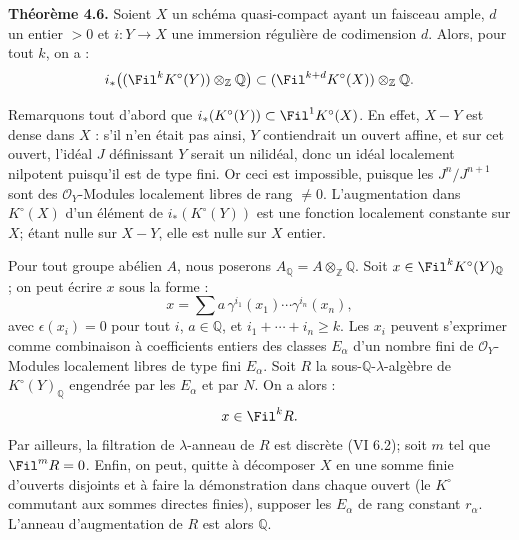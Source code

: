 \textbf{Théorème 4.6.}
Soient \(X\) un schéma quasi-compact ayant un faisceau ample, \(d\) un entier \(>0\) et \(i:Y\to X\) une immersion régulière de codimension \(d\). Alors, pour tout \(k\), on a :
\[
 i_*\bigl((\Fil^kK^\circ(Y))\otimes_{\mathbb Z}\mathbb Q\bigr)
 \subset
 (\Fil^{k+d}K^\circ(X))\otimes_{\mathbb Z}\mathbb Q.
\]

Remarquons tout d'abord que \(i_*(K^\circ(Y))\subset \Fil^1K^\circ(X)\). En effet, \(X-Y\) est dense dans \(X\) : s'il n'en était pas ainsi, \(Y\) contiendrait un ouvert affine, et sur cet ouvert, l'idéal \(J\) définissant \(Y\) serait un nilidéal, donc un idéal localement nilpotent puisqu'il est de type fini. Or ceci est impossible, puisque les \(J^n/J^{n+1}\) sont des \(\mathcal O_Y\)-Modules localement libres de rang \(\ne0\). L'augmentation dans \(K^\circ(X)\) d'un élément de \(i_*(K^\circ(Y))\) est une fonction localement constante sur \(X\); étant nulle sur \(X-Y\), elle est nulle sur \(X\) entier.

Pour tout groupe abélien \(A\), nous poserons \(A_{\mathbb Q}=A\otimes_{\mathbb Z}\mathbb Q\). Soit \(x\in\Fil^kK^\circ(Y)_{\mathbb Q}\) ; on peut écrire \(x\) sous la forme :
\[
  x=\sum a\,\gamma^{i_1}(x_1)\cdots\gamma^{i_n}(x_n),
\]
avec \(\epsilon(x_i)=0\) pour tout \(i\), \(a\in\mathbb Q\), et \(i_1+\cdots+i_n\ge k\). Les \(x_i\) peuvent s'exprimer comme combinaison à coefficients entiers des classes \(E_\alpha\) d'un nombre fini de \(\mathcal O_Y\)-Modules localement libres de type fini \(E_\alpha\). Soit \(R\) la sous-\(\mathbb Q\)-\(\lambda\)-algèbre de \(K^\circ(Y)_{\mathbb Q}\) engendrée par les \(E_\alpha\) et par \(N\). On a alors :
\[
  x\in\Fil^kR.
\]
Par ailleurs, la filtration de \(\lambda\)-anneau de \(R\) est discrète (VI 6.2); soit \(m\) tel que \(\Fil^mR=0\). Enfin, on peut, quitte à décomposer \(X\) en une somme finie d'ouverts disjoints et à faire la démonstration dans chaque ouvert (le \(K^\circ\) commutant aux sommes directes finies), supposer les \(E_\alpha\) de rang constant \(r_\alpha\). L'anneau d'augmentation de \(R\) est alors \(\mathbb Q\).

